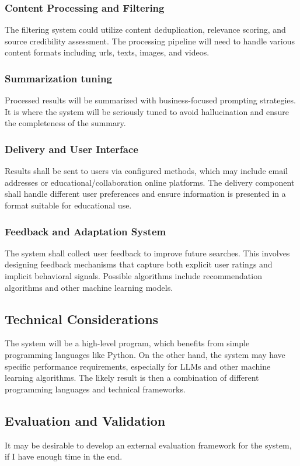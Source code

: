 \documentclass[project-plan]{report-template}
\begin{document}
\subsubsection{Content Processing and Filtering} The filtering system could
utilize
content deduplication, relevance scoring, and source credibility assessment.
The processing pipeline will need to handle various content formats including
urls, texts, images, and videos.

\subsubsection{Summarization tuning} Processed results will be summarized
with business-focused prompting strategies. It is where the system
will be seriously tuned to avoid hallucination and ensure the completeness of
the summary.

\subsubsection{Delivery and User Interface} Results shall be sent to users via
configured methods, which may include email addresses or
educational/collaboration online platforms. The delivery component shall handle
different user preferences and ensure information is presented in a format
suitable for educational use.

\subsubsection{Feedback and Adaptation System} The system shall collect user
feedback to improve
future searches. This involves designing feedback mechanisms that capture both
explicit user ratings and implicit behavioral signals. Possible algorithms
include recommendation algorithms and other machine learning models.

\subsection{Technical Considerations} 
The system will be a high-level program, which benefits from simple programming
languages like Python. On the other hand, the system may have specific
performance requirements, especially for LLMs and other machine learning
algorithms. The likely result is then a combination of different programming
languages and technical frameworks.

\subsection{Evaluation and Validation} 
It may be desirable to develop an external evaluation framework for the system,
if I have enough time in the end.

\clearpage


\end{document}
